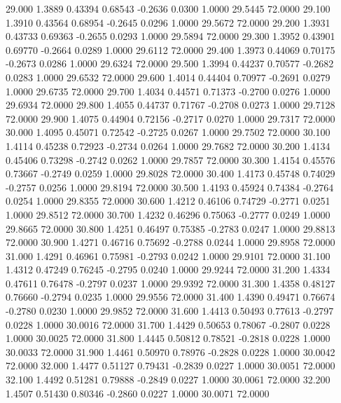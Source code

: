   29.000   1.3889   0.43394   0.68543  -0.2636   0.0300   1.0000  29.5445  72.0000
  29.100   1.3910   0.43564   0.68954  -0.2645   0.0296   1.0000  29.5672  72.0000
  29.200   1.3931   0.43733   0.69363  -0.2655   0.0293   1.0000  29.5894  72.0000
  29.300   1.3952   0.43901   0.69770  -0.2664   0.0289   1.0000  29.6112  72.0000
  29.400   1.3973   0.44069   0.70175  -0.2673   0.0286   1.0000  29.6324  72.0000
  29.500   1.3994   0.44237   0.70577  -0.2682   0.0283   1.0000  29.6532  72.0000
  29.600   1.4014   0.44404   0.70977  -0.2691   0.0279   1.0000  29.6735  72.0000
  29.700   1.4034   0.44571   0.71373  -0.2700   0.0276   1.0000  29.6934  72.0000
  29.800   1.4055   0.44737   0.71767  -0.2708   0.0273   1.0000  29.7128  72.0000
  29.900   1.4075   0.44904   0.72156  -0.2717   0.0270   1.0000  29.7317  72.0000
  30.000   1.4095   0.45071   0.72542  -0.2725   0.0267   1.0000  29.7502  72.0000
  30.100   1.4114   0.45238   0.72923  -0.2734   0.0264   1.0000  29.7682  72.0000
  30.200   1.4134   0.45406   0.73298  -0.2742   0.0262   1.0000  29.7857  72.0000
  30.300   1.4154   0.45576   0.73667  -0.2749   0.0259   1.0000  29.8028  72.0000
  30.400   1.4173   0.45748   0.74029  -0.2757   0.0256   1.0000  29.8194  72.0000
  30.500   1.4193   0.45924   0.74384  -0.2764   0.0254   1.0000  29.8355  72.0000
  30.600   1.4212   0.46106   0.74729  -0.2771   0.0251   1.0000  29.8512  72.0000
  30.700   1.4232   0.46296   0.75063  -0.2777   0.0249   1.0000  29.8665  72.0000
  30.800   1.4251   0.46497   0.75385  -0.2783   0.0247   1.0000  29.8813  72.0000
  30.900   1.4271   0.46716   0.75692  -0.2788   0.0244   1.0000  29.8958  72.0000
  31.000   1.4291   0.46961   0.75981  -0.2793   0.0242   1.0000  29.9101  72.0000
  31.100   1.4312   0.47249   0.76245  -0.2795   0.0240   1.0000  29.9244  72.0000
  31.200   1.4334   0.47611   0.76478  -0.2797   0.0237   1.0000  29.9392  72.0000
  31.300   1.4358   0.48127   0.76660  -0.2794   0.0235   1.0000  29.9556  72.0000
  31.400   1.4390   0.49471   0.76674  -0.2780   0.0230   1.0000  29.9852  72.0000
  31.600   1.4413   0.50493   0.77613  -0.2797   0.0228   1.0000  30.0016  72.0000
  31.700   1.4429   0.50653   0.78067  -0.2807   0.0228   1.0000  30.0025  72.0000
  31.800   1.4445   0.50812   0.78521  -0.2818   0.0228   1.0000  30.0033  72.0000
  31.900   1.4461   0.50970   0.78976  -0.2828   0.0228   1.0000  30.0042  72.0000
  32.000   1.4477   0.51127   0.79431  -0.2839   0.0227   1.0000  30.0051  72.0000
  32.100   1.4492   0.51281   0.79888  -0.2849   0.0227   1.0000  30.0061  72.0000
  32.200   1.4507   0.51430   0.80346  -0.2860   0.0227   1.0000  30.0071  72.0000

